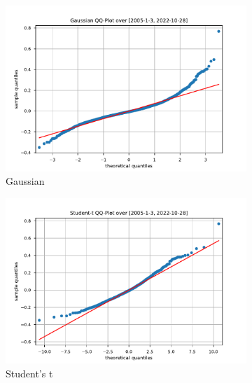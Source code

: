 \begin{figure}[htbp]
    \centering
    \begin{subfigure}[b]{0.32\textwidth}
        \centering
        \includegraphics[width=\textwidth]{content/reschap4/Figures/gauss_QQ_2005-1-3-2022-10-28.pdf}
        \caption{\small Gaussian}
    \end{subfigure}
    \hfill
    \begin{subfigure}[b]{0.32\textwidth}
        \centering
        \includegraphics[width=\textwidth]{content/reschap4/Figures/student_QQ_2005-1-3-2022-10-28.pdf}
        \caption{\small Student's t}
    \end{subfigure}
    \hfill
    \begin{subfigure}[b]{0.32\textwidth}
        \centering

\end{subfigure}
\end{figure}
